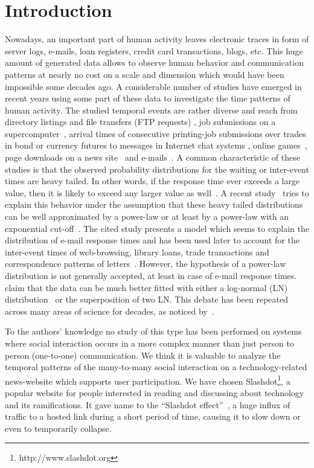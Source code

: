 \documentclass[twoside,11pt]{article}
\begin{document}
\section{Introduction}

\label{sec:intro}\noindent
Nowadays, an important part of human activity leaves electronic traces
in form of server logs, e-mails, loan registers, credit card
transactions, blogs, etc.  This huge amount of generated data allows
to observe human behavior and communication patterns at nearly no cost
on a scale and dimension which would have been impossible some decades
ago.  A considerable number of studies have emerged in recent years
using some part of these data to investigate the time patterns of
human activity.  The studied temporal events are rather diverse and
reach from directory listings and file transfers (FTP requests)
\citep{Paxson95}, job submissions on a supercomputer~\citep{Kleban03},
arrival times of consecutive printing-job submissions \citep{Harder06}
over trades in bond \citep{Mainardi00} or currency futures \citep{Masoliver03}
to messages in Internet chat systems \citep{Dewes03}, online
games~\citep{Henderson01}, page downloads on a
news site~\citep{Dezso06} and e-mails~\citep{johansen04}.  A common
characteristic of these studies is that the observed probability
distributions for the waiting or inter-event times are heavy tailed.
In other words, if the response time ever exceeds a large value, then
it is likely to exceed any larger value as well~\citep{Sigman99}. A
recent study~\citep{barabasi05} tries to explain this behavior under
the assumption that these heavy tailed distributions can be well
approximated by a power-law or at least by a power-law with an
exponential cut-off~\citep{Newman05}. The cited study presents a model
which seems to explain the distribution of e-mail response times and
has been used later to account for the inter-event times of
web-browsing, library loans, trade transactions and correspondence
patterns of letters~\citep{Vazquez06}.  However, the hypothesis of a
power-law distribution is not generally accepted, at least in case of
e-mail response times.  \citet{Stouffer06} claim
that the data can be much better fitted with either a log-normal (LN)
distribution~\citep{LimpertSA01} or the superposition of two LN. This
debate has been repeated across many areas of science for decades, as
noticed by~\citet{mitzen2004}.

To the authors' knowledge no study of this type has been performed on
systems where social interaction occurs in a more complex manner than
just person to person (one-to-one) communication.  We think it is
valuable to analyze the temporal patterns of the many-to-many social
interaction on a technology-related news-website which supports user
participation. We have chosen
Slashdot\footnote{http://www.slashdot.org}, a popular website for
people interested in reading and discussing about technology and its
ramifications.  It gave name to the ``Slashdot
effect''~\citep{Adler1999}, a huge influx of traffic to a hosted link
during a short period of time, causing it to slow down or even to
temporarily collapse.
\end{document}
